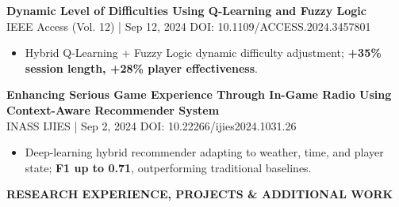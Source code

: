 \documentclass[11pt,a4paper]{article}
\begin{document}
\begin{minipage}[t]{14cm}
\begin{minipage}[t]{12.5cm}
\vspace{0.3cm}

\textbf{Dynamic Level of Difficulties Using Q-Learning and Fuzzy Logic}\\
{\small IEEE Access (Vol. 12) | Sep 12, 2024 \textbar{} DOI: 10.1109/ACCESS.2024.3457801}
\begin{itemize}[leftmargin=*, nosep, itemsep=2pt, topsep=2pt]
    \item Hybrid Q-Learning + Fuzzy Logic dynamic difficulty adjustment; \textbf{+35\% session length, +28\% player effectiveness}.
\end{itemize}

\vspace{0.3cm}

\textbf{Enhancing Serious Game Experience Through In-Game Radio Using Context-Aware Recommender System}\\
{\small INASS IJIES | Sep 2, 2024 \textbar{} DOI: 10.22266/ijies2024.1031.26}
\begin{itemize}[leftmargin=*, nosep, itemsep=2pt, topsep=2pt]
    \item Deep-learning hybrid recommender adapting to weather, time, and player state; \textbf{F1 up to 0.71}, outperforming traditional baselines.
\end{itemize}

\end{minipage}
\end{minipage}

\newpage


\vspace{1.2cm}

\begin{center}
{\large\bfseries\MakeUppercase{Research Experience, Projects \& Additional Work}}
\end{center}

\vspace{0.5cm}
\end{document}
